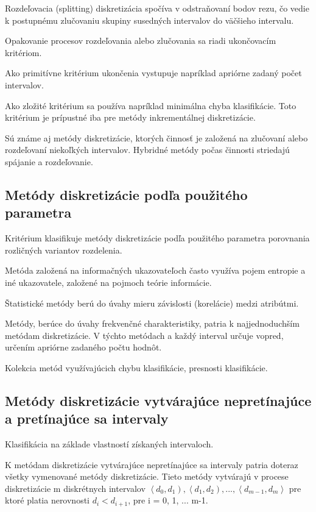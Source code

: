 Rozdeľovacia (splitting) diskretizácia spočíva v odstraňovaní bodov rezu, čo vedie k postupnému zlučovaniu skupiny susedných intervalov do väčšieho intervalu. 

Opakovanie procesov rozdeľovania alebo zlučovania sa riadi ukončovacím kritériom. 

Ako primitívne kritérium ukončenia vystupuje napríklad apriórne zadaný počet intervalov. 

Ako zložité kritérium sa používa napríklad minimálna chyba klasifikácie. Toto kritérium je prípustné iba pre metódy inkrementálnej diskretizácie. 

Sú známe aj metódy diskretizácie, ktorých činnosť je založená na zlučovaní alebo rozdeľovaní niekoľkých intervalov. 
Hybridné metódy počas činnosti striedajú spájanie a rozdeľovanie. \cite{levashenkoProj}

\subsection{Metódy diskretizácie podľa použitého parametra}
Kritérium klasifikuje metódy diskretizácie podľa použitého parametra porovnania rozličných variantov rozdelenia. 

Metóda založená na informačných ukazovateľoch často využíva pojem entropie a iné ukazovatele, založené na pojmoch teórie informácie. 

Štatistické metódy berú do úvahy mieru závislosti (korelácie) medzi atribútmi. 

Metódy, berúce do úvahy frekvenčné charakteristiky, patria k najjednoduchším metódam diskretizácie. V týchto metódach a každý interval určuje vopred, určením apriórne zadaného počtu hodnôt. 

Kolekcia metód využívajúcich chybu klasifikácie, presnosti klasifikácie. 

\subsection{Metódy diskretizácie vytvárajúce nepretínajúce a pretínajúce sa intervaly}
Klasifikácia na základe vlastností získaných intervaloch. 

K metódam diskretizácie vytvárajúce nepretínajúce sa intervaly patria doteraz všetky vymenované metódy diskretizácie. Tieto metódy vytvárajú v procese diskretizácie m diskrétnych intervalov
$
\left\langle d_0, d_1 \right) , 
\left\langle d_1, d_2 \right) , ... , 
\left\langle d_{m-1}, d_m \right\rangle 
$
pre ktoré platia nerovnosti $d_i < d_{i+1}$, pre i = 0, 1, ... m-1. 

